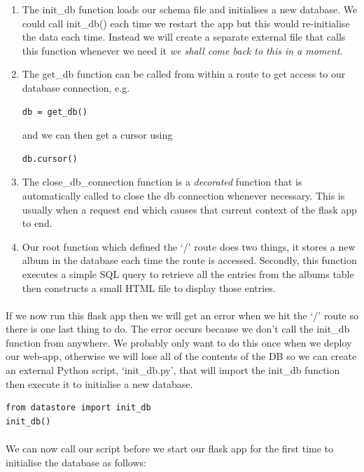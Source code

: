 \documentclass[12pt, a4paper, oneside]{book}
\begin{document}
{\begin{enumerate}
\item The init\_db function loads our schema file and initialises a new database. We could call init\_db() each time we restart the app but this would re-initialise the data each time. Instead we will create a separate external file that calls this function whenever we need it \emph{we shall come back to this in a moment}.
\item The get\_db function can be called from within a route to get access to our database connection, e.g.
\begin{lstlisting}[style=DOS]
db = get_db()
\end{lstlisting}
and we can then get a cursor using
\begin{lstlisting}[style=DOS]
db.cursor()
\end{lstlisting}
\item The close\_db\_connection function is a \emph{decorated} function that is automatically called to close the db connection whenever necessary. This is usually when a request end which causes that current context of the flask app to end.
\item Our root function which defined the `/' route does two things, it stores a new album in the database each time the route is accessed. Secondly, this function executes a simple SQL query to retrieve all the entries from the albums table then constructs a small HTML file to display those entries. 
\end{enumerate}

\paragraph{} If we now run this flask app then we will get an error when we hit the `/' route so there is one last thing to do. The error occurs because we don't call the init\_db function from anywhere. We probably only want to do this once when we deploy our web-app, otherwise we will lose all of the contents of the DB so we can create an external Python script, `init\_db.py', that will import the init\_db function then execute it to initialise a new database.

\begin{lstlisting}
from datastore import init_db
init_db()
\end{lstlisting}

\paragraph{} We can now call our script before we start our flask app for the first time to initialise the database as follows:

}
\end{document}
